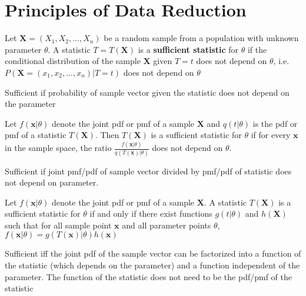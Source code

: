 \section*{Principles of Data Reduction}

\begin{defn}
    Let $\bm{X} = (X_1, X_2, ..., X_n)$ be a random sample from a population with unknown parameter $\theta$. A statistic $T = T(\bm{X})$ is a \textbf{sufficient statistic} for $\theta$ if the conditional distribution of the sample $\bm{X}$ given $T = t$ does not depend on $\theta$, i.e. $P(\bm{X}=(x_1, x_2, ..., x_n) | T = t)$ does not depend on $\theta$
\end{defn}

\begin{remark}
    Sufficient if probability of sample vector given the statistic does not depend on the parameter
\end{remark}

\begin{thm}
    Let $f(\bm{x}|\theta)$ denote the joint pdf or pmf of a sample $\bm{X}$ and $q(t|\theta)$ is the pdf or pmf of a statistic $T(\bm{X})$. 
    Then $T(\bm{X})$ is a sufficient statistic for $\theta$ if for every $\bm{x}$ in the sample space, the ratio $\frac{f(\bm{x}|\theta)}{q(T(\bm{x})|\theta)}$ does not depend on $\theta$.
\end{thm}

\begin{remark}
    Sufficient if joint pmf/pdf of sample vector divided by pmf/pdf of statistic does not depend on parameter.
\end{remark}

\begin{thm}
    Let $f(\bm{x}|\theta)$ denote the joint pdf or pmf of a sample $\bm{X}$. A statistic $T(\bm{X})$ is a sufficient statistic for $\theta$ if and only if there exist functions $g(t|\theta)$ and $h(\bm{X})$ such that for all sample point $\bm{x}$ and all parameter points $\theta$, $f(\bm{x}|\theta) = g(T(\bm{x})|\theta) h(\bm{x})$
\end{thm}

\begin{remark}
    Sufficient iff the joint pdf of the sample vector can be factorized into a function of the statistic (which depends on the parameter) and a function independent of the parameter. The function of the statistic does not need to be the pdf/pmf of the statistic
\end{remark}

